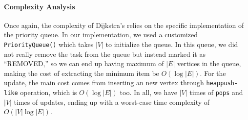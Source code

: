 \documentclass[../main.tex]{subfiles}
\begin{document}




\paragraph{Complexity  Analysis}
Once again, the complexity of Dijkstra's relies on the specific implementation of the priority queue.  In our implementation, we used a customized \texttt{PriorityQueue()} which takes $|V|$ to initialize the queue. In this queue, we did not really remove the task from the queue but instead  marked it as ``REMOVED,'' so we can end up having maximum of $|E|$ vertices in the queue, making the cost of extracting the minimum item   be $O(\log |E|)$. For the update, the main cost comes from inserting an new vertex through \texttt{heappush-like} operation, which is $O(\log |E|)$ too. In all, we have $|V|$ times of \texttt{pops} and $|V|$ times of updates, ending up with a worst-case time complexity of $O(|V|\log |E|)$.
\end{document}
